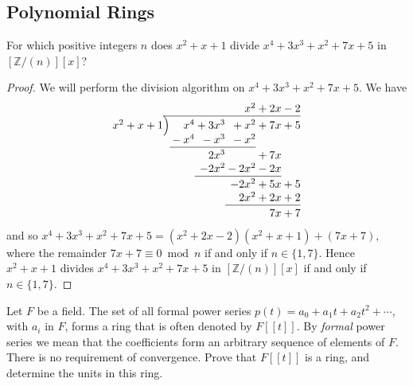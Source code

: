 \documentclass[12pt]{article}
\theoremstyle{remark}
\begin{document}
\subsection{Polynomial Rings}
\begin{problem}
  For which positive integers $n$ does $x^2 + x + 1$ divide $x^4 + 3x^3 + x^2 + 7x + 5$ in $[\mathbb{Z}/(n)][x]$?
\end{problem}
\begin{proof}
  We will perform the division algorithm on $x^4 + 3x^3 + x^2 + 7x + 5$. We have
  \begin{equation*}
    \arraycolsep=0pt
    \begin{array}{rc*5r}
      &&&&x^2&{}+2x&{}-2\\
      \cline{2-7}
      x^2+x+1&\Big)&x^4&{}+3x^3&{}+x^2&{}+7x&{}+5\\[-0.2em]
      &&{}-x^4&{}-x^3&{}-x^2\\
      \cline{3-5}\\[-1em]
      &&&2x^3&&{}+7x\\
      &&&-2x^2&{}-2x^2&{}-2x\\
      \cline{4-6}\\[-1em]
      &&&&-2x^2&{}+5x&{}+5\\
      &&&&2x^2&{}+2x&{}+2\\
      \cline{5-7}\\[-1em]
      &&&&&7x&{}+7
    \end{array}
  \end{equation*}
  and so $x^4 + 3x^3 + x^2 + 7x + 5 = (x^2 + 2x -2)(x^2 + x + 1) + (7x + 7)$, where the remainder $7x + 7 \equiv 0 \bmod n$ if and only if $n \in \{1,7\}$. Hence $x^2 + x + 1$ divides $x^4 + 3x^3 + x^2 + 7x + 5$ in $[\mathbb{Z}/(n)][x]$ if and only if $n\in \{1,7\}$.
\end{proof}
\begin{problem}\label{exc:11.2.2}
  Let $F$ be a field. The set of all formal power series $p(t) = a_0 + a_1t + a_2t^2 + \cdots$, with $a_i$ in $F$, forms a ring that is often denoted by $F[[t]]$. By \emph{formal} power series we mean that the coefficients form an arbitrary sequence of elements of $F$. There is no requirement of convergence. Prove that $F[[t]]$ is a ring, and determine the units in this ring.
\end{problem}
\end{document}

